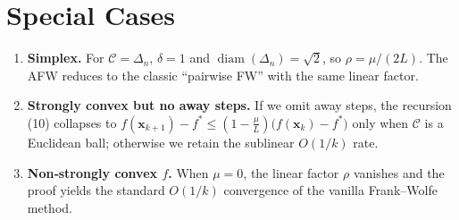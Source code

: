 \documentclass{article}
\newcommand{\diam}{\operatorname*{diam}}
\begin{document}
\section*{Special Cases}
\begin{enumerate}[label=\textbf{S\arabic*:}, leftmargin=*]
  \item \textbf{Simplex.} For $\mathcal{C}=\Delta_{n}$, $\delta=1$ and $\diam(\Delta_{n})=\sqrt{2}$, so $\rho=\mu/(2L)$. The AFW reduces to the classic ``pairwise FW'' with the same linear factor.
  \item \textbf{Strongly convex but no away steps.} If we omit away steps, the recursion (10) collapses to $f(\bm{x}_{k+1})-f^{*}\le (1-\tfrac{\mu}{L})\bigl(f(\bm{x}_{k})-f^{*}\bigr)$ only when $\mathcal{C}$ is a Euclidean ball; otherwise we retain the sublinear $O(1/k)$ rate.
  \item \textbf{Non‑strongly convex $f$.} When $\mu=0$, the linear factor $\rho$ vanishes and the proof yields the standard $O(1/k)$ convergence of the vanilla Frank–Wolfe method.
\end{enumerate}
\end{document}
